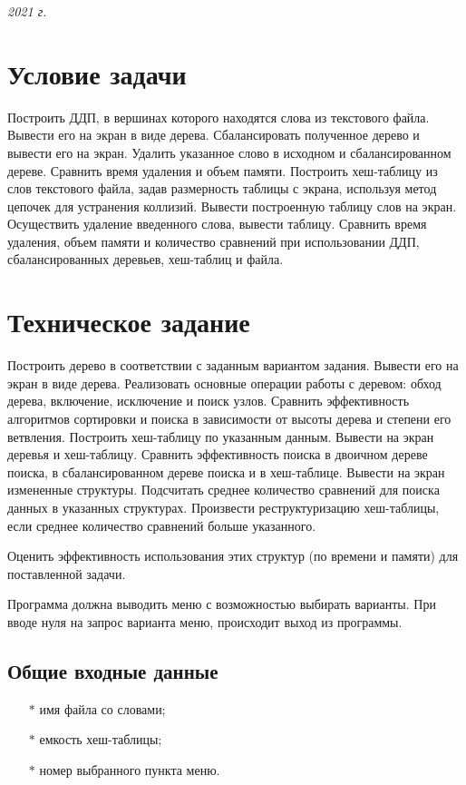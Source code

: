 \documentclass[a4paper,12pt]{extarticle}
\begin{document}
\vspace{7cm}
\begin{center} \textit{2021 г.} \end{center}
\thispagestyle{empty}
\newpage

\tableofcontents
\newpage

\section{Условие задачи}

Построить ДДП, в вершинах которого находятся слова из текстового файла. Вывести его на экран в виде дерева. Сбалансировать полученное дерево и вывести его на экран. Удалить указанное слово в исходном и сбалансированном дереве. Сравнить время удаления и объем памяти. Построить хеш-таблицу из слов текстового файла, задав размерность таблицы с экрана, используя метод цепочек для устранения коллизий. Вывести построенную таблицу слов на экран. Осуществить удаление введенного слова, вывести таблицу. Сравнить время удаления, объем памяти и количество сравнений при использовании ДДП, сбалансированных деревьев, хеш-таблиц и файла.

\newpage

\section{Техническое задание}

Построить дерево в соответствии с заданным вариантом задания. Вывести его на экран в виде дерева. Реализовать основные операции работы с деревом: обход дерева, включение, исключение и поиск узлов. Сравнить эффективность алгоритмов сортировки и поиска в зависимости от высоты дерева и степени его ветвления. Построить хеш-таблицу по указанным данным. Вывести на экран деревья и хеш-таблицу. Сравнить эффективность поиска в двоичном дереве поиска, в сбалансированном дереве поиска и в хеш-таблице. Вывести на экран измененные структуры. Подсчитать среднее количество сравнений для поиска данных в указанных структурах. Произвести реструктуризацию хеш-таблицы, если среднее количество сравнений больше указанного. 

Оценить эффективность использования этих структур (по времени и памяти) для поставленной задачи.

Программа должна выводить меню с возможностью выбирать варианты. При вводе нуля на запрос варианта меню, происходит выход из программы.

\subsection{Общие входные данные}
\begin{itemize}
	\item[$*$] имя файла со словами;
	\item[$*$] емкость хеш-таблицы;
    \item[$*$] номер выбранного пункта меню.
\end{itemize}
\end{document}
